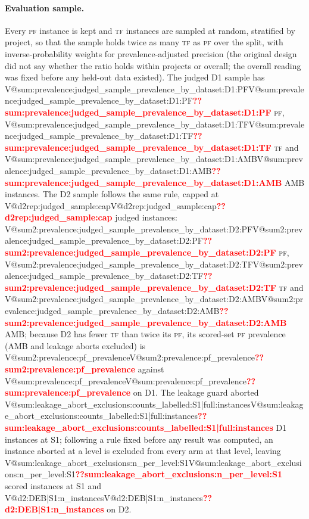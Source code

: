 \documentclass[pdflatex,iicol,sn-mathphys-num]{sn-jnl}
\makeatletter
\newcommand{\V}[1]{\ifcsname V@#1\endcsname\csname V@#1\endcsname\else\textbf{\textcolor{red}{??#1}}\fi}
\newcommand{\PF}{\textsc{pf}}
\newcommand{\TF}{\textsc{tf}}
\makeatother
\begin{document}
\paragraph{Evaluation sample.} Every \PF{} instance is kept and \TF{} instances are sampled at random, stratified by project, so that the sample holds twice as many \TF{} as \PF{} over the split, with inverse-probability weights for prevalence-adjusted precision (the original design did not say whether the ratio holds within projects or overall; the overall reading was fixed before any held-out data existed). The judged D1 sample has \V{sum:prevalence:judged_sample_prevalence_by_dataset:D1:PF} \PF, \V{sum:prevalence:judged_sample_prevalence_by_dataset:D1:TF} \TF{} and \V{sum:prevalence:judged_sample_prevalence_by_dataset:D1:AMB} AMB instances. The D2 sample follows the same rule, capped at \V{d2rep:judged_sample:cap} judged instances: \V{sum2:prevalence:judged_sample_prevalence_by_dataset:D2:PF} \PF, \V{sum2:prevalence:judged_sample_prevalence_by_dataset:D2:TF} \TF{} and \V{sum2:prevalence:judged_sample_prevalence_by_dataset:D2:AMB} AMB; because D2 has fewer \TF{} than twice its \PF, its scored-set \PF{} prevalence (AMB and leakage aborts excluded) is \V{sum2:prevalence:pf_prevalence} against \V{sum:prevalence:pf_prevalence} on D1. The leakage guard aborted \V{sum:leakage_abort_exclusions:counts_labelled:S1|full:instances} D1 instances at S1; following a rule fixed before any result was computed, an instance aborted at a level is excluded from every arm at that level, leaving \V{sum:leakage_abort_exclusions:n_per_level:S1} scored instances at S1 and \V{d2:DEB|S1:n_instances} on D2.
\end{document}
